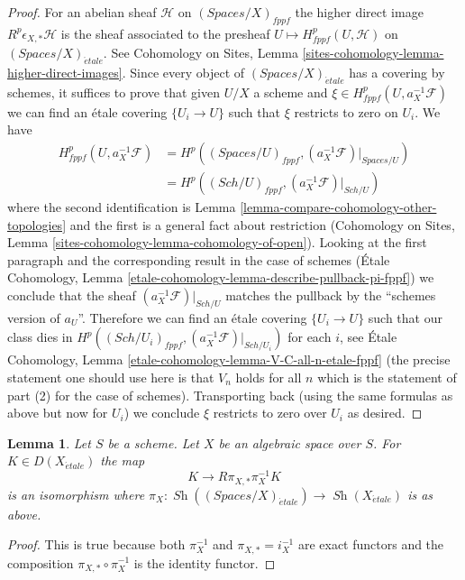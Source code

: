\documentclass{stacks-project}
\theoremstyle{plain}
\newtheorem{lemma}[subsection]{Lemma}
\theoremstyle{definition}
\theoremstyle{remark}
\numberwithin{equation}{subsection}
\def\Sch{\mathit{Sch}}
\def\Sh{\mathop{\mathit{Sh}}\nolimits}
\def\etale{{\acute{e}tale}}
\begin{document}
\begin{proof}
\medskip\noindent
For an abelian sheaf $\mathcal{H}$ on $(\textit{Spaces}/X)_{fppf}$ the
higher direct image $R^p\epsilon_{X, *}\mathcal{H}$ is the sheaf
associated to the presheaf $U \mapsto H^p_{fppf}(U, \mathcal{H})$
on $(\textit{Spaces}/X)_\etale$. See
Cohomology on Sites, Lemma \ref{sites-cohomology-lemma-higher-direct-images}.
Since every object of $(\textit{Spaces}/X)_\etale$ has a covering
by schemes, it suffices to prove that given $U/X$ a scheme and
$\xi \in H^p_{fppf}(U, a_X^{-1}\mathcal{F})$ we can find
an \'etale covering $\{U_i \to U\}$ such that $\xi$
restricts to zero on $U_i$. We have
\begin{align*}
H^p_{fppf}(U, a_X^{-1}\mathcal{F})
& =
H^p((\textit{Spaces}/U)_{fppf}, (a_X^{-1}\mathcal{F})|_{\textit{Spaces}/U}) \\
& =
H^p((\Sch/U)_{fppf}, (a_X^{-1}\mathcal{F})|_{\Sch/U})
\end{align*}
where the second identification is
Lemma \ref{lemma-compare-cohomology-other-topologies}
and the first is a general fact about restriction
(Cohomology on Sites, Lemma \ref{sites-cohomology-lemma-cohomology-of-open}).
Looking at the first paragraph and the corresponding result in the
case of schemes (\'Etale Cohomology, Lemma
\ref{etale-cohomology-lemma-describe-pullback-pi-fppf})
we conclude that the sheaf $(a_X^{-1}\mathcal{F})|_{\Sch/U}$
matches the pullback by the ``schemes version of $a_U$''.
Therefore we can find an \'etale covering
$\{U_i \to U\}$ such that our class dies in
$H^p((\Sch/U_i)_{fppf}, (a_X^{-1}\mathcal{F})|_{\Sch/U_i})$
for each $i$, see
\'Etale Cohomology, Lemma \ref{etale-cohomology-lemma-V-C-all-n-etale-fppf}
(the precise statement one should use here is that $V_n$ holds for all $n$
which is the statement of part (2) for the case of schemes).
Transporting back (using the same formulas as above but now for
$U_i$) we conclude $\xi$ restricts to zero over $U_i$ as desired.
\end{proof}

\begin{lemma}
\label{lemma-cohomological-descent-etale}
Let $S$ be a scheme. Let $X$ be an algebraic space over $S$.
For $K \in D(X_\etale)$ the map
$$
K \longrightarrow R\pi_{X, *}\pi_X^{-1}K
$$
is an isomorphism where
$\pi_X : \Sh((\textit{Spaces}/X)_\etale) \to \Sh(X_\etale)$ is as above.
\end{lemma}

\begin{proof}
This is true because both $\pi_X^{-1}$ and $\pi_{X, *} = i_X^{-1}$
are exact functors and the composition $\pi_{X, *} \circ \pi_X^{-1}$
is the identity functor.
\end{proof}
\end{document}

